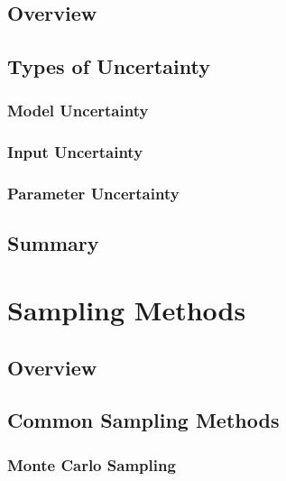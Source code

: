 \documentclass[fancy, masters,twoside]{byuthesis}
\begin{document}
\hypertarget{overview}{%
\section{Overview}\label{overview}}

\hypertarget{types-of-uncertainty}{%
\section{Types of Uncertainty}\label{types-of-uncertainty}}

\hypertarget{model-uncertainty}{%
\subsection{Model Uncertainty}\label{model-uncertainty}}

\hypertarget{input-uncertainty}{%
\subsection{Input Uncertainty}\label{input-uncertainty}}

\hypertarget{parameter-uncertainty}{%
\subsection{Parameter Uncertainty}\label{parameter-uncertainty}}

\hypertarget{summary}{%
\section{Summary}\label{summary}}

\hypertarget{sampling-methods}{%
\chapter{Sampling Methods}\label{sampling-methods}}

\hypertarget{overview-1}{%
\section{Overview}\label{overview-1}}

\hypertarget{common-sampling-methods}{%
\section{Common Sampling Methods}\label{common-sampling-methods}}

\hypertarget{monte-carlo-sampling}{%
\subsection{Monte Carlo Sampling}\label{monte-carlo-sampling}}
\end{document}
